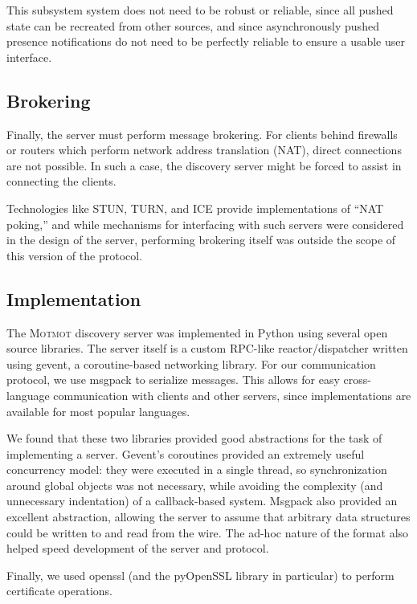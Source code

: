\documentclass{sig-alternate}
\newcommand\Motmot{\textsc{Motmot}\xspace}
\begin{document}
This subsystem system does not need to be robust or reliable, since all pushed
state can be recreated from other sources, and since asynchronously pushed
presence notifications do not need to be perfectly reliable to ensure a usable
user interface.

\subsection{Brokering}

Finally, the server must perform message brokering. For clients behind firewalls
or routers which perform network address translation (NAT), direct connections
are not possible. In such a case, the discovery server might be forced to assist
in connecting the clients.

Technologies like STUN, TURN, and ICE provide implementations of ``NAT poking,''
and while mechanisms for interfacing with such servers were considered in the
design of the server, performing brokering itself was outside the scope of this
version of the protocol.

\subsection{Implementation}

The \Motmot discovery server was implemented in Python using several open source
libraries. The server itself is a custom RPC-like reactor/dispatcher written
using gevent, a coroutine-based networking library. For our communication
protocol, we use msgpack to serialize messages. This allows for easy
cross-language communication with clients and other servers, since
implementations are available for most popular languages.

We found that these two libraries provided good abstractions for the task of
implementing a server. Gevent's coroutines provided an extremely useful
concurrency model: they were executed in a single thread, so synchronization
around global objects was not necessary, while avoiding the complexity (and
unnecessary indentation) of a callback-based system. Msgpack also provided an
excellent abstraction, allowing the server to assume that arbitrary data
structures could be written to and read from the wire. The ad-hoc nature of the
format also helped speed development of the server and protocol.

Finally, we used openssl (and the pyOpenSSL library in particular) to perform
certificate operations.
\end{document}
